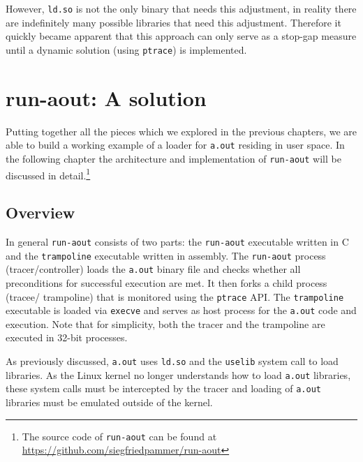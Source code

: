 \documentclass[draft,final]{vutinfth} %
\begin{document}
However, \texttt{ld.so} is not the only binary that needs this adjustment, in reality there are indefinitely many possible libraries that need this adjustment. Therefore it quickly became apparent that this approach can only serve as a stop-gap measure until a dynamic solution (using \texttt{ptrace}) is implemented.

\chapter{run-aout: A solution}
\label{solution}

Putting together all the pieces which we explored in the previous chapters, we are able to build a working example of a loader for \texttt{a.out} residing in user space. In the following chapter the architecture and implementation of \texttt{run-aout} will be discussed in detail.\footnote{The source code of \texttt{run-aout} can be found at \url{https://github.com/siegfriedpammer/run-aout}}

\section{Overview}
\label{solution_overview}

In general \texttt{run-aout} consists of two parts: the \texttt{run-aout} executable written in C and the \texttt{trampoline} executable written in assembly. The \texttt{run-aout} process (tracer/controller) loads the \texttt{a.out} binary file and checks whether all preconditions for successful execution are met. It then forks a child process (tracee/ trampoline) that is monitored using the \texttt{ptrace} API. The \texttt{trampoline} executable is loaded via \texttt{execve} and serves as host process for the \texttt{a.out} code and execution. Note that for simplicity, both the tracer and the trampoline are executed in 32-bit processes.

As previously discussed, \texttt{a.out} uses \texttt{ld.so} and the \texttt{uselib} system call to load libraries. As the Linux kernel no longer understands how to load \texttt{a.out} libraries, these system calls must be intercepted by the tracer and loading of \texttt{a.out} libraries must be emulated outside of the kernel.
\end{document}

